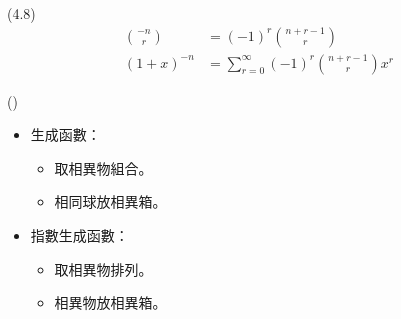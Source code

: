 \item \begin{theorem}{(4.8)} 
    \begin{equation}
        \begin{aligned}
            \binom{-n}{r} & = (-1)^r\binom{n + r - 1}{r} \\
            (1 + x)^{-n} & = \sum_{r = 0}^{\infty}(-1)^r\binom{n + r - 1}{r} x^r
        \end{aligned}
    \end{equation}
\end{theorem}

\item \begin{theorem}{()} \quad\quad 
    \begin{itemize}
        \item 生成函數：
        \begin{itemize}
            \item 取相異物組合。
            \item 相同球放相異箱。
        \end{itemize}
        \item 指數生成函數：
        \begin{itemize}
            \item 取相異物排列。
            \item 相異物放相異箱。
        \end{itemize}
    \end{itemize}
\end{theorem}